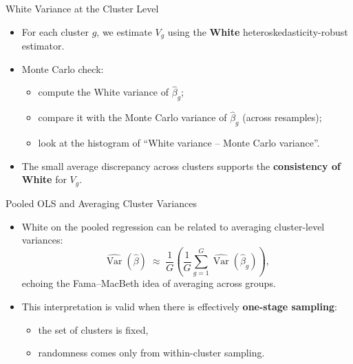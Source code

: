 \documentclass[
  ignorenonframetext,
]{beamer}
\providecommand{\tightlist}{%
  \setlength{\itemsep}{0pt}\setlength{\parskip}{0pt}}
\begin{document}
\begin{frame}{White Variance at the Cluster Level}
\label{white-variance-at-the-cluster-level}
\begin{itemize}
\tightlist
\item
  For each cluster \(g\), we estimate \(V_g\) using the \textbf{White}
  heteroskedasticity-robust estimator.\\
\item
  Monte Carlo check:

  \begin{itemize}
  \tightlist
  \item
    compute the White variance of \(\hat{\beta}_g\);
  \item
    compare it with the Monte Carlo variance of \(\hat{\beta}_g\)
    (across resamples);
  \item
    look at the histogram of ``White variance -- Monte Carlo variance''.
  \end{itemize}
\item
  The small average discrepancy across clusters supports the
  \textbf{consistency of White} for \(V_g\).
\end{itemize}
\end{frame}

\begin{frame}{Pooled OLS and Averaging Cluster Variances}
\label{pooled-ols-and-averaging-cluster-variances}
\begin{itemize}
\tightlist
\item
  White on the pooled regression can be related to averaging
  cluster-level variances:\\
  \[
  \widehat{\operatorname{Var}}(\hat{\beta})
  \;\approx\;
  \frac{1}{G}
  \left(
    \frac{1}{G}\sum_{g=1}^G \widehat{\operatorname{Var}}(\hat{\beta}_g)
  \right),
  \] echoing the Fama--MacBeth idea of averaging across groups.\\
\item
  This interpretation is valid when there is effectively
  \textbf{one-stage sampling}:

  \begin{itemize}
  \tightlist
  \item
    the set of clusters is fixed,
  \item
    randomness comes only from within-cluster sampling.
  \end{itemize}
\end{itemize}
\end{frame}
\end{document}
